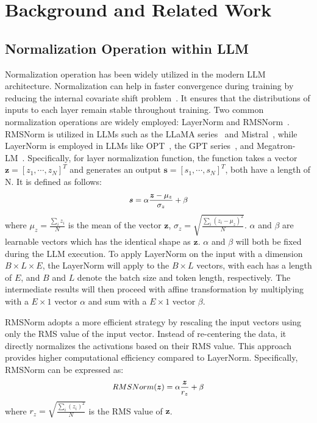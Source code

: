 \section{Background and Related Work}
\label{sec:background}
\subsection{Normalization Operation within LLM}
\label{sec:layernorm}

Normalization operation has been widely utilized in the modern LLM architecture. Normalization can help in faster convergence during training by reducing the internal covariate shift problem~\cite{ba2016layer}. It ensures that the distributions of inputs to each layer remain stable throughout training. Two common normalization operations are widely employed: LayerNorm and RMSNorm~\cite{zhang2019root}. RMSNorm is utilized in LLMs such as the LLaMA series~\cite{touvron2023llama, touvron2023llama2} and Mistral~\cite{jiang2023mistral}, while LayerNorm is employed in LLMs like OPT~\cite{zhang2022opt}, the GPT series~\cite{brown2020language}, and Megatron-LM~\cite{shoeybi2019megatron}.
Specifically, for layer normalization function, the function takes a vector $\boldsymbol{z}=[z_1,\cdots,z_N]^T$ and generates an output $\boldsymbol{s}=[s_1,\cdots,s_N]^T$, both have a length of N. It is defined as follows:
\begin{equation}
\label{eqn:layernorm}
\small
\boldsymbol{s}=\alpha\frac{\boldsymbol{z}-\mu_{z}}{\sigma_{z}} + \beta
\end{equation}
where $\mu_{z}=\frac{\sum_{i} z_{i}}{N}$ is the mean of the vector $\boldsymbol{z}$, $\sigma_{z} = \sqrt{\frac{\sum_{i} (z_{i}-\mu_{z})^{2}}{N}}$. $\alpha$ and $\beta$ are learnable vectors which has the identical shape as $\boldsymbol{z}$. $\alpha$ and $\beta$ will both be fixed during the LLM execution. To apply LayerNorm on the input with a dimension $B\times L\times E$, the LayerNorm will apply to the $B\times L$ vectors, with each has a length of $E$, and $B$ and $L$ denote the batch size and token length, respectively. The intermediate results will then proceed with affine transformation by multiplying with a $E\times 1$ vector $\alpha$ and sum with a $E\times 1$ vector $\beta$.

RMSNorm adopts a more efficient strategy by rescaling the input vectors using only the RMS value of the input vector. Instead of re-centering the data, it directly normalizes the activations based on their RMS value. This approach provides higher computational efficiency compared to LayerNorm. Specifically, RMSNorm can be expressed as:
\begin{equation}
\label{eqn:rmsnorm}
\small
RMSNorm(\boldsymbol{z})=\alpha\frac{\boldsymbol{z}}{r_{z}} + \beta
\end{equation}
where $r_{z} = \sqrt{\frac{\sum_{i} (z_{i})^{2}}{N}}$ is the RMS value of $\boldsymbol{z}$.


